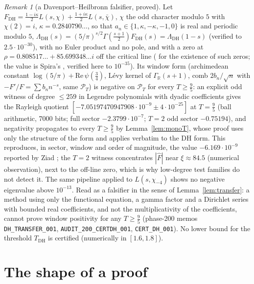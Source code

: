 \documentclass[11pt]{amsart}
\theoremstyle{definition}
\theoremstyle{remark}
\newtheorem{remark}[theorem]{Remark}
\newcommand{\R}{\mathbb R}
\newcommand{\PT}{\mathcal P_T}
\begin{document}
\begin{remark}[a Davenport--Heilbronn falsifier, proved]\label{rem:FDH}
Let $F_{\mathrm{DH}}=\tfrac{1-i\kappa}2L(s,\chi)+\tfrac{1+i\kappa}2L(s,\bar\chi)$, $\chi$ the odd character modulo $5$ with
$\chi(2)=i$, $\kappa=0.2840790\ldots$, so that $a_n\in\{1,\kappa,-\kappa,-1,0\}$ is real and periodic modulo $5$,
$\Lambda_{\mathrm{DH}}(s)=(5/\pi)^{s/2}\Gamma(\tfrac{s+1}2)F_{\mathrm{DH}}(s)=\Lambda_{\mathrm{DH}}(1-s)$ (verified to
$2.5\cdot10^{-30}$), with no Euler product and no pole, and with a zero at $\rho=0.808517\ldots+85.699348\ldots i$ off the critical line
(\cite{DavenportHeilbronn1936} for the existence of such zeros; the value is Spira's \cite{Spira1994}, verified here to $10^{-35}$). Its window form (archimedean constant $\log(5/\pi)+\mathrm{Re}\,\psi(\tfrac34)$, L\'evy kernel of
$\Gamma_\R(s+1)$, comb $2b_n/\sqrt n$ with $-F'/F=\sum b_nn^{-s}$, same $\PT$) is negative on $\PT$ for every
$T\ge\frac95$: an explicit odd witness of degree $\le259$ in Legendre polynomials with dyadic coefficients gives the Rayleigh
quotient $[-7.05197470947908\cdot10^{-9}\pm4\cdot10^{-25}]$ at $T=\frac95$ (ball arithmetic, 7000 bits; full sector
$-2.3799\cdot10^{-7}$; $T=2$ odd sector $-0.75194$), and negativity propagates to every $T\ge\frac95$ by Lemma~\ref{lem:monoT}, whose proof uses only the structure of the form and applies verbatim to the DH form. This reproduces, in sector,
window and order of magnitude, the value $-6.169\cdot10^{-9}$ reported by Ziad \cite{ZiadDH}; the $T=2$ witness concentrates $|\hat F|$
near $\xi\approx84.5$ (numerical observation), next to the off-line zero, which is why low-degree test families do not detect it. The same pipeline applied to
$L(s,\chi_{-4})$ shows no negative eigenvalue above $10^{-13}$. Read as a falsifier in the sense of Lemma~\ref{lem:transfer}: a
method using only the functional equation, a gamma factor and a Dirichlet series with bounded real coefficients, and not the
multiplicativity of the coefficients, cannot prove window positivity for any $T\ge\frac95$ (phase-200 memos \texttt{DH\_TRANSFER\_001}, \texttt{AUDIT\_200\_CERTDH\_001},
\texttt{CERT\_DH\_001}). No lower bound for the threshold $T_{\mathrm{DH}}$ is certified (numerically in $[1.6,1.8]$).
\end{remark}

\section{The shape of a proof}\label{sec:shape}
\end{document}
